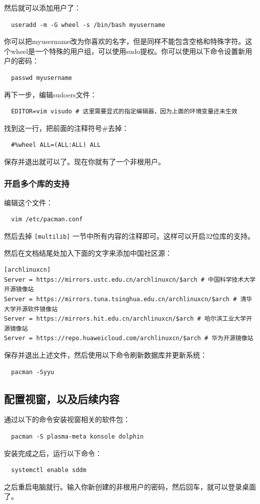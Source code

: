然后就可以添加用户了：
\begin{verbatim}
  useradd -m -G wheel -s /bin/bash myusername
\end{verbatim}
你可以把myusername改为你喜欢的名字，但是同样不能包含空格和特殊字符。这个wheel是一个特殊的用户组，可以使用sudo提权。你可以使用以下命令设置新用户的密码：
\begin{verbatim}
  passwd myusername
\end{verbatim}
再下一步，编辑sudoers文件：
\begin{verbatim}
  EDITOR=vim visudo # 这里需要显式的指定编辑器，因为上面的环境变量还未生效
\end{verbatim}
找到这一行，把前面的注释符号\#去掉：
\begin{verbatim}
  #%wheel ALL=(ALL:ALL) ALL
\end{verbatim}
保存并退出就可以了。现在你就有了一个非根用户。

\subsubsection{开启多个库的支持}

编辑这个文件：
\begin{verbatim}
  vim /etc/pacman.conf
\end{verbatim}
然后去掉 \texttt{[multilib]} 一节中所有内容的注释即可。这样可以开启32位库的支持。

然后在文档结尾处加入下面的文字来添加中国社区源：
\begin{verbatim}
[archlinuxcn]
Server = https://mirrors.ustc.edu.cn/archlinuxcn/$arch # 中国科学技术大学开源镜像站
Server = https://mirrors.tuna.tsinghua.edu.cn/archlinuxcn/$arch # 清华大学开源软件镜像站
Server = https://mirrors.hit.edu.cn/archlinuxcn/$arch # 哈尔滨工业大学开源镜像站
Server = https://repo.huaweicloud.com/archlinuxcn/$arch # 华为开源镜像站
\end{verbatim}

保存并退出上述文件，然后使用以下命令刷新数据库并更新系统：
\begin{verbatim}
  pacman -Syyu
\end{verbatim}

\subsection{配置视窗，以及后续内容}

通过以下的命令安装视窗相关的软件包：
\begin{verbatim}
  pacman -S plasma-meta konsole dolphin
\end{verbatim}
安装完成之后，运行以下命令：
\begin{verbatim}
  systemctl enable sddm
\end{verbatim}
之后重启电脑就行。输入你新创建的非根用户的密码，然后回车，就可以登录桌面了。

